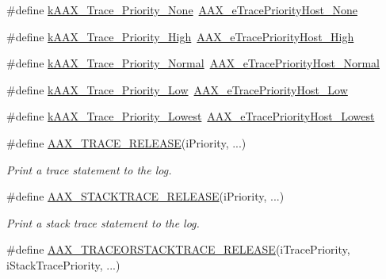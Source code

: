 \begin{DoxyCompactItemize}
\item 
\#define \hyperlink{a00158_a262e3b6568764baa53f893d9dc6bbc23}{k\+A\+A\+X\+\_\+\+Trace\+\_\+\+Priority\+\_\+\+None}~\hyperlink{a00206_a2dd667e4dea5781f38832fd9f1725f1ba906b1198b124fa17cd5821cbb140a63f}{A\+A\+X\+\_\+e\+Trace\+Priority\+Host\+\_\+\+None}
\item 
\#define \hyperlink{a00158_a5edd9a4ac559a4ef99a948c2ebd422db}{k\+A\+A\+X\+\_\+\+Trace\+\_\+\+Priority\+\_\+\+High}~\hyperlink{a00206_a2dd667e4dea5781f38832fd9f1725f1baac76cc64a1379931edbc2bdc0f8aad66}{A\+A\+X\+\_\+e\+Trace\+Priority\+Host\+\_\+\+High}
\item 
\#define \hyperlink{a00158_a8a6953f26f36747357d5d95f96dcf68d}{k\+A\+A\+X\+\_\+\+Trace\+\_\+\+Priority\+\_\+\+Normal}~\hyperlink{a00206_a2dd667e4dea5781f38832fd9f1725f1ba327226d6962ad7f297506697c2001ce0}{A\+A\+X\+\_\+e\+Trace\+Priority\+Host\+\_\+\+Normal}
\item 
\#define \hyperlink{a00158_abd6b80f2e0a26581086b21b7e7ad0ce9}{k\+A\+A\+X\+\_\+\+Trace\+\_\+\+Priority\+\_\+\+Low}~\hyperlink{a00206_a2dd667e4dea5781f38832fd9f1725f1ba78edfc70bf7ba33fc5277e4146498c17}{A\+A\+X\+\_\+e\+Trace\+Priority\+Host\+\_\+\+Low}
\item 
\#define \hyperlink{a00158_a68d0297c90a8d294e19ea781f8cda96a}{k\+A\+A\+X\+\_\+\+Trace\+\_\+\+Priority\+\_\+\+Lowest}~\hyperlink{a00206_a2dd667e4dea5781f38832fd9f1725f1baf101af483c232de54b31eba274a07c4c}{A\+A\+X\+\_\+e\+Trace\+Priority\+Host\+\_\+\+Lowest}
\item 
\#define \hyperlink{a00158_ac2aa820ece56bb59140ad561218db4b3}{A\+A\+X\+\_\+\+T\+R\+A\+C\+E\+\_\+\+R\+E\+L\+E\+A\+S\+E}(i\+Priority, ...)
\begin{DoxyCompactList}\small\item\em Print a trace statement to the log. \end{DoxyCompactList}\item 
\#define \hyperlink{a00158_a51f7dcc4ce960ab8855ec97f031a1463}{A\+A\+X\+\_\+\+S\+T\+A\+C\+K\+T\+R\+A\+C\+E\+\_\+\+R\+E\+L\+E\+A\+S\+E}(i\+Priority, ...)
\begin{DoxyCompactList}\small\item\em Print a stack trace statement to the log. \end{DoxyCompactList}\item 
\#define \hyperlink{a00158_a74f610a8e4359a5fc3eae89be3eb3a4b}{A\+A\+X\+\_\+\+T\+R\+A\+C\+E\+O\+R\+S\+T\+A\+C\+K\+T\+R\+A\+C\+E\+\_\+\+R\+E\+L\+E\+A\+S\+E}(i\+Trace\+Priority,  i\+Stack\+Trace\+Priority, ...)

\end{DoxyCompactItemize}
